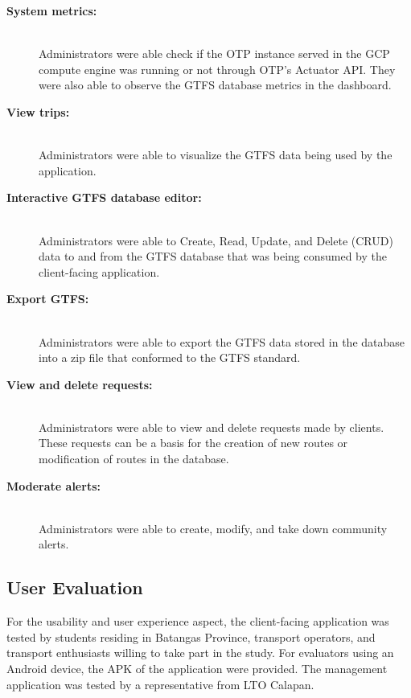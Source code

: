 \documentclass[journal]{./IEEE/IEEEtran}
\begin{document}
\begin{description}
    \item[\textbf{System metrics:}] \hfill \\
        Administrators were able check if the OTP instance served in the GCP compute engine was running or not through OTP's Actuator API. They were also able to observe the GTFS database metrics in the dashboard.

    \item[\textbf{View trips:}] \hfill \\
        Administrators were able to visualize the GTFS data being used by the application.

    \item[\textbf{Interactive GTFS database editor:}] \hfill \\
        Administrators were able to Create, Read, Update, and Delete (CRUD) data to and from the GTFS database that was being consumed by the client-facing application.


    \item[\textbf{Export GTFS:}] \hfill \\
        Administrators were able to export the GTFS data stored in the database into a zip file that conformed to the GTFS standard. 


    \item[\textbf{View and delete requests:}] \hfill \\
       Administrators were able to view and delete requests made by clients. These requests can be a basis for the creation of new routes or modification of routes in the database.
    
    \item[\textbf{Moderate alerts:}] \hfill \\
       Administrators were able to create, modify, and take down community alerts.
\end{description}

\subsection{User Evaluation}
For the usability and user experience aspect, the client-facing application was tested by students residing in Batangas Province, transport operators, and transport enthusiasts willing to take part in the study. For evaluators using an Android device, the APK of the application were provided.
The management application was tested by a representative from LTO Calapan.
\end{document}
